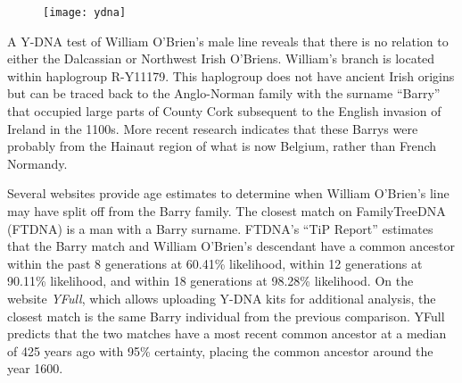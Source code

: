 \begin{figure}
	\centering
	\texttt{[image: ydna]}
	\caption{}
\end{figure}

A Y-DNA test of William O'Brien's male line\cite{BigY} reveals that there is no relation to either the Dalcassian or Northwest Irish O'Briens. William's branch is located within haplogroup R-Y11179. This haplogroup does not have ancient Irish origins but can be traced back to the Anglo-Norman family with the surname ``Barry'' that occupied large parts of County Cork subsequent to the English invasion of Ireland in the 1100s.\cite{BarrymoreDNA:9} More recent research indicates that these Barrys were probably from the Hainaut region of what is now Belgium, rather than French Normandy.\cite{BarrymoreDNA:2-4}

Several websites provide age estimates to determine when William O'Bri\-en's line may have split off from the Barry family. The closest match on FamilyTreeDNA (FTDNA) is a man with a Barry surname. FTDNA's ``TiP Report'' estimates that the Barry match and William O'Brien's descendant have a common ancestor within the past 8 generations at 60.41\% likelihood, within 12 generations at 90.11\% likelihood, and within 18 generations at 98.28\% likelihood.\cite{TiP} On the website \textit{YFull}, which allows uploading Y-DNA kits for additional analysis, the closest match is the same Barry individual from the previous comparison. YFull predicts that the two matches have a most recent common ancestor at a median of 425 years ago with 95\% certainty, placing the common ancestor around the year 1600.\cite{YFull}

